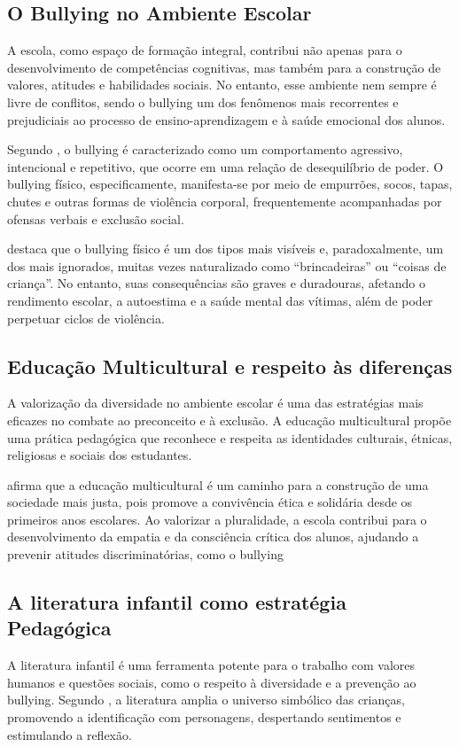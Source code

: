 		\subsection{O Bullying no Ambiente Escolar}
			A escola, como espaço de formação integral, contribui não apenas para o desenvolvimento de competências cognitivas, mas também para a construção de valores, atitudes e habilidades sociais. No entanto, esse ambiente nem sempre é livre de conflitos, sendo o bullying um dos fenômenos mais recorrentes e prejudiciais ao processo de ensino-aprendizagem e à saúde emocional dos alunos.
			
			Segundo , o bullying é caracterizado como um comportamento agressivo, intencional e repetitivo, que ocorre em uma relação de desequilíbrio de poder. O bullying físico, especificamente, manifesta-se por meio de empurrões, socos, tapas, chutes e outras formas de violência corporal, frequentemente acompanhadas por ofensas verbais e exclusão social.
			
			 destaca que o bullying físico é um dos tipos mais visíveis e, paradoxalmente, um dos mais ignorados, muitas vezes naturalizado como “brincadeiras” ou “coisas de criança”. No entanto, suas consequências são graves e duradouras, afetando o rendimento escolar, a autoestima e a saúde mental das vítimas, além de poder perpetuar ciclos de violência. 
			
		\subsection{Educação Multicultural e respeito às diferenças }
			A valorização da diversidade no ambiente escolar é uma das estratégias mais eficazes no combate ao preconceito e à exclusão. A educação multicultural propõe uma prática pedagógica que reconhece e respeita as identidades culturais, étnicas, religiosas e sociais dos estudantes.
			
			 afirma que a educação multicultural é um caminho para a construção de uma sociedade mais justa, pois promove a convivência ética e solidária desde os primeiros anos escolares. Ao valorizar a pluralidade, a escola contribui para o desenvolvimento da empatia e da consciência crítica dos alunos, ajudando a prevenir atitudes discriminatórias, como o bullying
			
		\subsection{A literatura infantil como estratégia Pedagógica}
			A literatura infantil é uma ferramenta potente para o trabalho com valores humanos e questões sociais, como o respeito à diversidade e a prevenção ao bullying. Segundo , a literatura amplia o universo simbólico das crianças, promovendo a identificação com personagens, despertando sentimentos e estimulando a reflexão.
			
